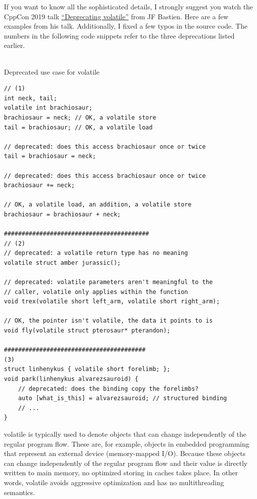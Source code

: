 If you want to know all the sophisticated details, I strongly suggest you watch the CppCon 2019 talk \href{https://www.youtube.com/watch?v=KJW_DLaVXIY}{“Deprecating volatile”} from JF Bastien. Here are a few examples from his talk. Additionally, I fixed a few typos in the source code. The numbers in the following code snippets refer to the three deprecations listed earlier.

\hspace*{\fill} \\ %
\noindent
Deprecated use case for volatile
\begin{lstlisting}[style=styleCXX]
// (1)
int neck, tail;
volatile int brachiosaur;
brachiosaur = neck; // OK, a volatile store
tail = brachiosaur; // OK, a volatile load

// deprecated: does this access brachiosaur once or twice
tail = brachiosaur = neck;

// deprecated: does this access brachiosaur once or twice
brachiosaur += neck;

// OK, a volatile load, an addition, a volatile store
brachiosaur = brachiosaur + neck;

#########################################
// (2)
// deprecated: a volatile return type has no meaning
volatile struct amber jurassic();

// deprecated: volatile parameters aren't meaningful to the
// caller, volatile only applies within the function
void trex(volatile short left_arm, volatile short right_arm);

// OK, the pointer isn't volatile, the data it points to is
void fly(volatile struct pterosaur* pterandon);

########################################
(3)
struct linhenykus { volatile short forelimb; };
void park(linhenykus alvarezsauroid) {
	// deprecated: does the binding copy the forelimbs?
	auto [what_is_this] = alvarezsauroid; // structured binding
	// ...
}
\end{lstlisting}

\begin{tcolorbox}[colback=red!5!white,colframe=red!75!black,title={volatile and Multithreading Semantics}]
volatile is typically used to denote objects that can change independently of the regular program flow. These are, for example, objects in embedded programming that represent an external device (memory-mapped I/O). Because these objects can change independently of the regular program flow and their value is directly written to main memory, no optimized storing in caches takes place. In other words, volatile avoids aggressive optimization and has no multithreading semantics.
\end{tcolorbox}

